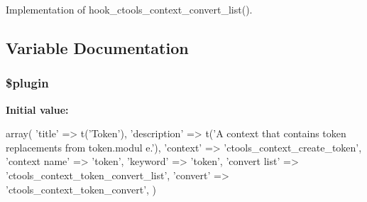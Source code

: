 \label{profiles_2dosomething_2modules_2contrib_2ctools_2plugins_2contexts_2token_8inc_a7a253406a63a33265393b3468539a6f7}
Implementation of hook\_\-ctools\_\-context\_\-convert\_\-list(). 

\subsection{Variable Documentation}
\hypertarget{profiles_2dosomething_2modules_2contrib_2ctools_2plugins_2contexts_2token_8inc_ada8a7130088351710bb02ed622d6bf65}{
\subsubsection[{\$plugin}]{\setlength{\rightskip}{0pt plus 5cm}\$plugin}}
\label{profiles_2dosomething_2modules_2contrib_2ctools_2plugins_2contexts_2token_8inc_ada8a7130088351710bb02ed622d6bf65}
{\bfseries Initial value:}
\begin{DoxyCode}
 array(
  'title' => t('Token'),
  'description' => t('A context that contains token replacements from token.modul
      e.'),
  'context' => 'ctools_context_create_token',  
  'context name' => 'token',
  'keyword' => 'token',
  'convert list' => 'ctools_context_token_convert_list',
  'convert' => 'ctools_context_token_convert',
)
\end{DoxyCode}
